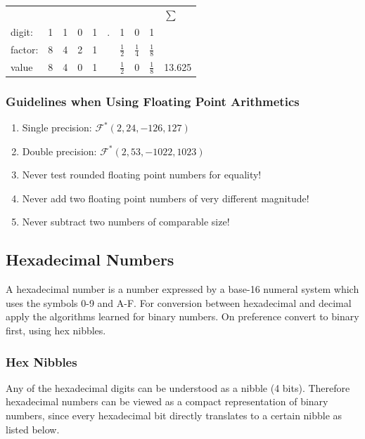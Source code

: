 \documentclass[10pt,a4paper]{scrartcl}
\begin{document}
\begin{multicols*}{2}
\begin{center}
\begin{tabular}{llllllllll}
&&&&&&&&&$\sum$\\
digit:&1&1&0&1&.&1&0&1\\
factor:&8&4&2&1&&$\frac{1}{2}$&$\frac{1}{4}$&$\frac{1}{8}$\\
value&8&4&0&1&&$\frac{1}{2}$&0&$\frac{1}{8}$&13.625
\end{tabular}
\end{center}

\subsubsection{Guidelines when Using Floating Point Arithmetics}
\label{sec:GuidelinesWhenUsinFloatingPointArithmetics}

\begin{enumerate}
\item Single precision: $\mathcal{F}^\ast(2,24,-126,127)$
\item Double precision: $\mathcal{F}^\ast(2,53,-1022,1023)$
\item Never test rounded floating point numbers for equality!
\item Never add two floating point numbers of very different magnitude!
\item Never subtract two numbers of comparable size!
\end{enumerate}

\subsection{Hexadecimal Numbers}
\label{sec:HexadecimalNumbers}

A hexadecimal number is a number expressed by a base-16 numeral system which uses the symbols 0-9 and A-F. For conversion between hexadecimal and decimal apply the algorithms learned for binary numbers. On preference convert to binary first, using hex nibbles.

\subsubsection{Hex Nibbles}
\label{sec:HexNibbles}

Any of the hexadecimal digits can be understood as a nibble (4 bits). Therefore hexadecimal numbers can be viewed as a compact representation of binary numbers, since every hexadecimal bit directly translates to a certain nibble as listed below.


\end{multicols*}
\end{document}
